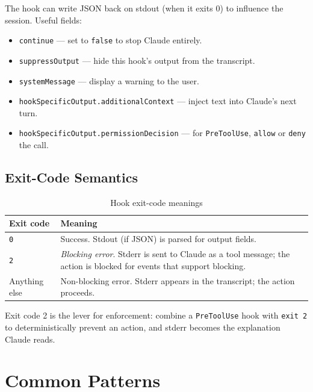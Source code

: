 The hook can write JSON back on stdout (when it exits 0) to influence the
session. Useful fields:

\begin{itemize}
  \item \texttt{continue} — set to \texttt{false} to stop Claude entirely.
  \item \texttt{suppressOutput} — hide this hook's output from the transcript.
  \item \texttt{systemMessage} — display a warning to the user.
  \item \texttt{hookSpecificOutput.additionalContext} — inject text into
        Claude's next turn.
  \item \texttt{hookSpecificOutput.permissionDecision} — for
        \texttt{PreToolUse}, \texttt{allow} or \texttt{deny} the call.
\end{itemize}

\subsection{Exit-Code Semantics}


\begin{table}[ht]
\centering
\caption{Hook exit-code meanings}
\label{tab:hook-exit-codes}
\begin{tabularx}{\textwidth}{lX}
\toprule
\textbf{Exit code} & \textbf{Meaning} \\
\midrule
\texttt{0}     & Success. Stdout (if JSON) is parsed for output fields. \\
\texttt{2}     & \emph{Blocking error}. Stderr is sent to Claude as a tool message; the action is blocked for events that support blocking. \\
Anything else  & Non-blocking error. Stderr appears in the transcript; the action proceeds. \\
\bottomrule
\end{tabularx}
\end{table}

Exit code 2 is the lever for enforcement: combine a \texttt{PreToolUse} hook
with \texttt{exit 2} to deterministically prevent an action, and stderr
becomes the explanation Claude reads.

\section{Common Patterns}
\label{sec:hook-patterns}

